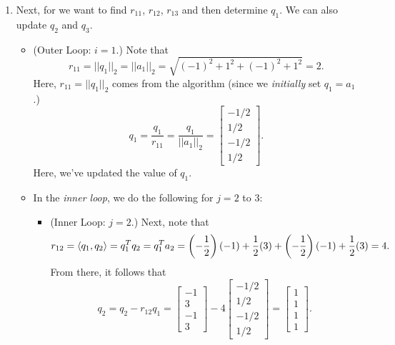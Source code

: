 \documentclass[letterpaper]{article}
\begin{document}
\begin{mdframed}
\begin{enumerate}
        \item Next, for we want to find $r_{11}$, $r_{12}$, $r_{13}$ and then determine $q_1$. We can also update $q_2$ and $q_3$. 
        
        \begin{itemize}
            \item (Outer Loop: $i = 1$.) Note that 
            \[r_{11} = ||q_1||_2 = ||a_1||_2 = \sqrt{(-1)^2 + 1^2 + (-1)^2 + 1^2} = 2.\]
            Here, $r_{11} = ||q_1||_2$ comes from the algorithm (since we \emph{initially} set $q_1 = a_1$.)
            \[q_1 = \frac{q_1}{r_{11}} = \frac{q_1}{||a_1||_2} = \begin{bmatrix}
                -1/2 \\ 1/2 \\ -1/2 \\ 1/2
            \end{bmatrix}.\]
            Here, we've updated the value of $q_1$. 
    
            \item In the \emph{inner loop}, we do the following for $j = 2$ to $3$:
            \begin{itemize}
                \item (Inner Loop: $j = 2$.) Next, note that 
                \[r_{12} = \langle q_1, q_2 \rangle = q_1^T q_2 = q_1^T a_2 = \left(-\frac{1}{2}\right)(-1) + \frac{1}{2}(3) + \left(-\frac{1}{2}\right)(-1) + \frac{1}{2}(3) = 4.\]
                From there, it follows that 
                \[q_2 = q_2 - r_{12}q_1 = \begin{bmatrix}
                    -1 \\ 3 \\ -1 \\ 3
                \end{bmatrix} - 4 \begin{bmatrix}
                    -1/2 \\ 1/2 \\ -1/2 \\ 1/2
                \end{bmatrix} = \begin{bmatrix}
                    1 \\ 1 \\ 1 \\ 1
                \end{bmatrix}.\]
        

\end{itemize}
\end{itemize}
\end{enumerate}
\end{mdframed}
\end{document}
